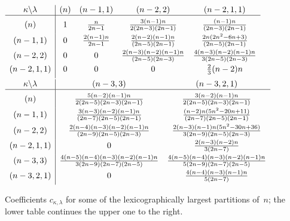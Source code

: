 \documentclass{mathincs}
\numberwithin{equation}{section}
\numberwithin{figure}{section}
\theoremstyle{plain}
\theoremstyle{definition}
\theoremstyle{remark}
\theoremstyle{plain}
\theoremstyle{definition}
\theoremstyle{plain}
\theoremstyle{plain}
\begin{document}
\begin{table}
\parbox{0.8\textwidth}{
$
 \begin{array}{c|cccc}
   \kappa\backslash\lambda & (n) & (n-1,1) & (n-2,2) & (n-2,1,1)\\
   \hline \rule{0pt}{14pt}
   (n) & 1 & \frac{n}{2n-1} & \frac{3(n-1)n}{2(2n-3)(2n-1)} & \frac{(n-1)n}{(2n-3)(2n-1)}\\[1ex]
   (n-1,1) & 0 & \frac{2(n-1)n}{2n-1} & \frac{2(n-2)(n-1)n}{(2n-5)(2n-1)} & \frac{2n(2n^{2}-6n+3)}{(2n-5)(2n-1)}\\[1ex]
   (n-2,2) & 0 & 0 & \frac{2(n-3)(n-2)(n-1)n}{(2n-5)(2n-3)} & \frac{4(n-3)(n-2)(n-1)n}{3(2n-5)(2n-3)}\\[1ex]
   (n-2,1,1) & 0 & 0 & 0 & \frac{2}{3}(n-2)n\\[1ex]
 \end{array}
$ \\[1ex]
$
 \begin{array}{c|cc}
   \kappa\backslash\lambda & (n-3,3) & (n-3,2,1)\\
   \hline \rule{0pt}{14pt}
   (n) & \frac{5(n-2)(n-1)n}{2(2n-5)(2n-3)(2n-1)} & \frac{3(n-2)(n-1)n}{2(2n-5)(2n-3)(2n-1)}\\[1ex]
   (n-1,1) & \frac{3(n-3)(n-2)(n-1)n}{(2n-7)(2n-5)(2n-1)} & \frac{(n-2)n(5n^{2}-20n+11)}{(2n-7)(2n-5)(2n-1)}\\[1ex]
   (n-2,2) & \frac{2(n-4)(n-3)(n-2)(n-1)n}{(2n-9)(2n-5)(2n-3)} & \frac{2(n-3)(n-1)n(5n^{2}-30n+36)}{3(2n-9)(2n-5)(2n-3)}\\[1ex]
   (n-2,1,1) & 0 & \frac{2(n-3)(n-2)n}{3(2n-7)}\\[1ex]
   (n-3,3) & \frac{4(n-5)(n-4)(n-3)(n-2)(n-1)n}{3(2n-9)(2n-7)(2n-5)} & \frac{4(n-5)(n-4)(n-3)(n-2)(n-1)n}{5(2n-9)(2n-7)(2n-5)}\\[1ex]
   (n-3,2,1) & 0 & \frac{4(n-4)(n-3)(n-1)n}{5(2n-7)}\\[1ex]
 \end{array}
$ \\[1ex]
}
\caption{Coefficients $c_{\kappa,\lambda}$ for some of the lexicographically
largest partitions of~$n$; the lower table continues the upper one
to the right.}
\label{tab:cn1} 
\end{table}
\end{document}
